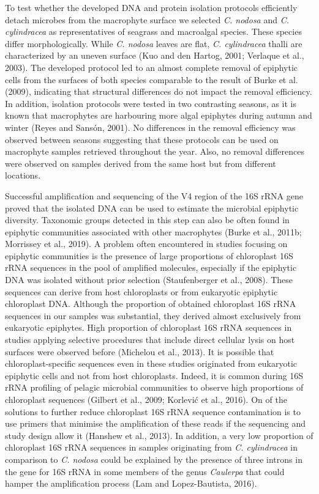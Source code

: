 \documentclass[12pt,]{article}
\begin{document}
To test whether the developed DNA and protein isolation protocols
efficiently detach microbes from the macrophyte surface we selected
\emph{C. nodosa} and \emph{C. cylindracea} as representatives of
seagrass and macroalgal species. These species differ morphologically.
While \emph{C. nodosa} leaves are flat, \emph{C. cylindracea} thalli are
characterized by an uneven surface (Kuo and den Hartog, 2001; Verlaque
et al., 2003). The developed protocol led to an almost complete removal
of epiphytic cells from the surfaces of both species comparable to the
result of Burke et al. (2009), indicating that structural differences do
not impact the removal efficiency. In addition, isolation protocols were
tested in two contrasting seasons, as it is known that macrophytes are
harbouring more algal epiphytes during autumn and winter (Reyes and
Sansón, 2001). No differences in the removal efficiency was observed
between seasons suggesting that these protocols can be used on
macrophyte samples retrieved throughout the year. Also, no removal
differences were observed on samples derived from the same host but from
different locations.

Successful amplification and sequencing of the V4 region of the 16S rRNA
gene proved that the isolated DNA can be used to estimate the microbial
epiphytic diversity. Taxonomic groups detected in this step can also be
often found in epiphytic communities associated with other macrophytes
(Burke et al., 2011b; Morrissey et al., 2019). A problem often
encountered in studies focusing on epiphytic communities is the presence
of large proportions of chloroplast 16S rRNA sequences in the pool of
amplified molecules, especially if the epiphytic DNA was isolated
without prior selection (Staufenberger et al., 2008). These sequences
can derive from host chloroplasts or from eukaryotic epiphytic
chloroplast DNA. Although the proportion of obtained chloroplast 16S
rRNA sequences in our samples was substantial, they derived almost
exclusively from eukaryotic epiphytes. High proportion of chloroplast
16S rRNA sequences in studies applying selective procedures that include
direct cellular lysis on host surfaces were observed before (Michelou et
al., 2013). It is possible that chloroplast-specific sequences even in
these studies originated from eukaryotic epiphytic cells and not from
host chloroplasts. Indeed, it is common during 16S rRNA profiling of
pelagic microbial communities to observe high proportions of chloroplast
sequences (Gilbert et al., 2009; Korlević et al., 2016). On of the
solutions to further reduce chloroplast 16S rRNA sequence contamination
is to use primers that minimise the amplification of these reads if the
sequencing and study design allow it (Hanshew et al., 2013). In
addition, a very low proportion of chloroplast 16S rRNA sequences in
samples originating from \emph{C. cylindracea} in comparison to \emph{C.
nodosa} could be explained by the presence of three introns in the gene
for 16S rRNA in some members of the genus \emph{Caulerpa} that could
hamper the amplification process (Lam and Lopez-Bautista, 2016).
\end{document}
